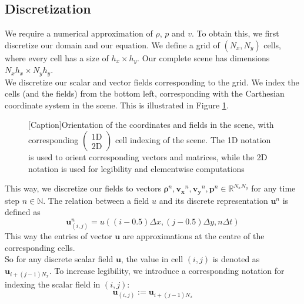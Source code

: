 \documentclass{article}
\renewcommand{\vec}[1]{\mathbf{#1}}
\newcommand{\gvec}[1]{\boldsymbol#1}
\begin{document}
\subsection{Discretization}
We require a numerical approximation of $\rho$, $p$ and $v$. To obtain this, we first discretize our domain and our equation. We define a grid of $(N_x,N_y)$ cells, where every cell has a size of $h_x\times h_y$. Our complete scene has dimensions $N_xh_x\times N_yh_y$. 
\ \\
We discretize our scalar and vector fields corresponding to the grid. We index the cells (and the fields) from the bottom left, corresponding with the Carthesian coordinate system in the scene. This is illustrated in Figure \ref{fig:indexing}.
\begin{figure}
	\centering
	[Caption]{Orientation of the coordinates and fields in the scene, with corresponding $\left(\begin{matrix}\text{1D} \\ \text{2D} \end{matrix}\right)$ cell indexing of the scene. The 1D notation is used to orient corresponding vectors and matrices, while the 2D notation is used for legibility and elementwise computations}
	\label{fig:indexing}
\end{figure}
This way, we discretize our fields to vectors $\gvec{\rho}^n,\vec{v_x}^n,\vec{v_y}^n, \vec{p}^n\in\mathbb{R}^{N_xN_y}$ for any time step $n\in\mathbb{N}$. The relation between a field $u$ and its discrete representation $\vec{u}^n$ is defined as
$$\vec{u}^n_{(i,j)} = u((i-0.5)\Delta x,(j-0.5)\Delta y,n\Delta t)$$
This way the entries of vector $\vec{u}$ are approximations at the centre of the corresponding cells.
\ \\
So for any discrete scalar field $\vec{u}$, the value in cell $(i,j)$ is denoted as $\vec{u}_{i+(j-1)N_x}$. To increase legibility, we introduce a corresponding notation for indexing the scalar field in $(i,j)$:
\begin{equation}
	\vec{u}_{(i,j)}:=\vec{u}_{i+(j-1)N_x}
\end{equation}
\end{document}
